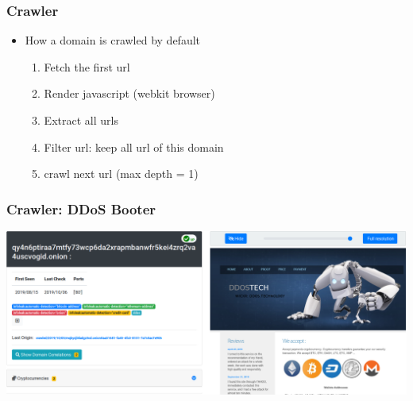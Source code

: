 \documentclass{beamer}
\begin{document}
\begin{frame}
\begin{figure}[h]
\end{figure} 
\end{frame}

\begin{frame}
    \frametitle{Crawler}
    \begin{itemize}
    \item[] How a domain is crawled by default
		\begin{enumerate}
		    \item Fetch the first url
            \item Render javascript (webkit browser)
		    \item Extract all urls
		    \item Filter url: keep all url of this domain
		    \item crawl next url (max depth = 1)
		\end{enumerate}
    \end{itemize}
\end{frame}

\begin{frame}
    \frametitle{Crawler: DDoS Booter}
    \centerline{
        \includegraphics[scale=0.23]{images/crawled-ddos.png}
    }
\end{frame}
\end{document}
